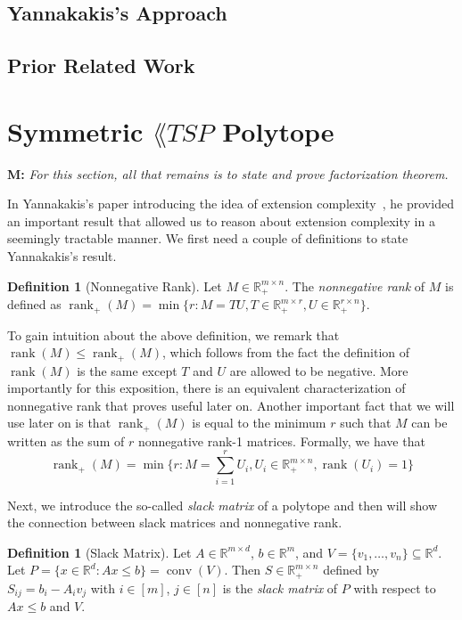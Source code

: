 \documentclass{article}
\theoremstyle{definition}
\newtheorem{definition}[theorem]{Definition}
\theoremstyle{remark}
\newcommand{\nrank}{\operatorname{rank}_+}
\newcommand{\rank}{\operatorname{rank}}
\newcommand{\conv}{\operatorname{conv}}
\renewcommand{\R}{\mathbb{R}}
\newcommand{\mnote}[1]{{\color{blue}\noindent\textbf{M: }\marginpar{****}\textit{{#1}}}}
\begin{document}
\subsection{Yannakakis's Approach}\label{sec:Yannakakis}

\subsection{Prior Related Work}


\section{Symmetric $\lang{TSP}$ Polytope}

\mnote{For this section, all that remains is to state and prove factorization theorem.}

In Yannakakis's paper introducing the idea of extension complexity~\cite{yannakakis}, he provided an important result that allowed us to reason about extension complexity in a seemingly tractable manner. We first need a couple of definitions to state Yannakakis's result.

\begin{definition}[Nonnegative Rank]
Let $M \in \R_+^{m \times n}$. The \emph{nonnegative rank} of $M$ is defined as $\nrank(M) = \min\{r : M = TU, T \in \R_+^{m \times r}, U \in \R_+^{r \times n}\}$.
\end{definition}

To gain intuition about the above definition, we remark that $\rank(M) \le \nrank(M)$, which follows from the fact the definition of $\rank(M)$ is the same except $T$ and $U$ are allowed to be negative. More importantly for this exposition, there is an equivalent characterization of nonnegative rank that proves useful later on. Another important fact that we will use later on is that $\nrank(M)$ is equal to the minimum $r$ such that $M$ can be written as the sum of $r$ nonnegative rank-1 matrices. Formally, we have that 
\[
\nrank(M) = \min\{r : M =\sum_{i=1}^r U_i, U_i \in \R_+^{m \times n}, \rank(U_i) = 1\}
\]

Next, we introduce the so-called \emph{slack matrix} of a polytope and then will show the connection between slack matrices and nonnegative rank.

\begin{definition}[Slack Matrix]
Let $A \in \R^{m \times d}$, $b \in \R^m$, and $V = \{v_1, \ldots, v_n\} \subseteq \R^d$. Let $P = \{x \in \R^d : Ax \le b\} = \conv(V)$. Then $S \in \R_+^{m\times n}$ defined by $S_{ij} = b_i - A_i v_j$ with $i \in [m]$, $j \in [n]$ is the \emph{slack matrix} of $P$ with respect to $Ax \le b$ and $V$.
\end{definition}
\end{document}
